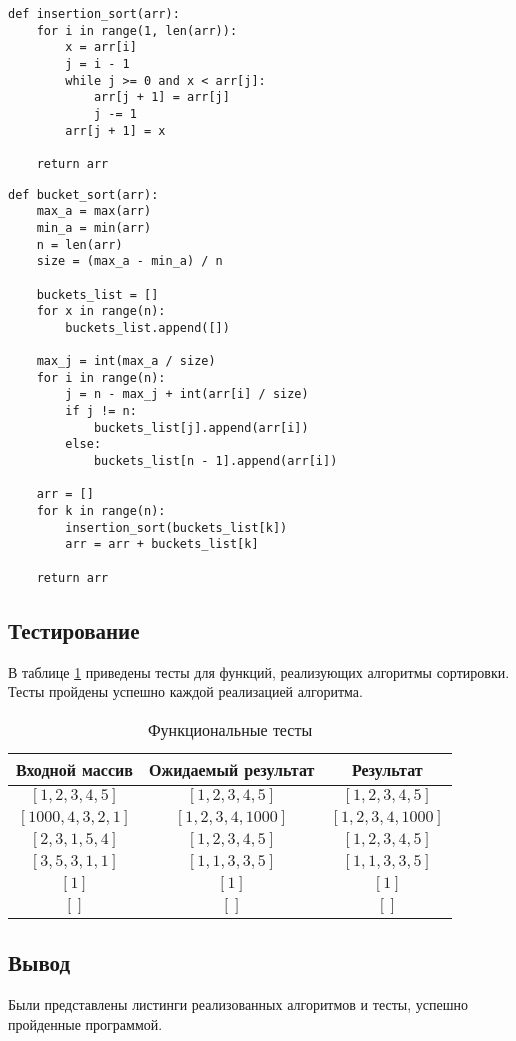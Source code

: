 \begin{lstlisting}[label=lst:insert_sort,caption= Алгоритм сортировки вставками]
def insertion_sort(arr):
    for i in range(1, len(arr)):
        x = arr[i]
        j = i - 1
        while j >= 0 and x < arr[j]:
            arr[j + 1] = arr[j]
            j -= 1
        arr[j + 1] = x

    return arr
\end{lstlisting}
\clearpage

\begin{lstlisting}[label=lst:bucket_sort,caption=Алгоритм блочной сортировки]
def bucket_sort(arr):
    max_a = max(arr)
    min_a = min(arr)
    n = len(arr)
    size = (max_a - min_a) / n

    buckets_list = []
    for x in range(n):
        buckets_list.append([])

    max_j = int(max_a / size)
    for i in range(n):
        j = n - max_j + int(arr[i] / size)
        if j != n:
            buckets_list[j].append(arr[i])
        else:
            buckets_list[n - 1].append(arr[i])

    arr = []
    for k in range(n):
        insertion_sort(buckets_list[k])
        arr = arr + buckets_list[k]

    return arr
\end{lstlisting}
\clearpage

\subsection{Тестирование}

В таблице \ref{tbl:functional_test} приведены тесты для функций, реализующих алгоритмы сортировки. 
Тесты пройдены успешно каждой реализацией алгоритма.


\begin{table}[h]
	\begin{center}
		\caption{\label{tbl:functional_test} Функциональные тесты}
		\begin{tabular}{|c|c|c|}
			\hline
			Входной массив & Ожидаемый результат & Результат \\ 
			\hline
			$[1,2,3,4,5]$ & $[1,2,3,4,5]$  & $[1,2,3,4,5]$\\
			$[1000,4,3,2,1]$  & $[1,2,3,4,1000]$ & $[1,2,3,4,1000]$\\
			$[2,3,1,5,4]$  & $[1,2,3,4,5]$  & $[1,2,3,4,5]$\\
			$[3,5,3,1,1]$  & $[1,1,3,3,5]$  & $[1,1,3,3,5]$\\
			$[1]$  & $[1]$  & $[1]$\\
			$[]$  & $[]$  & $[]$\\
			\hline
		\end{tabular}
	\end{center}
\end{table}


\subsection*{Вывод}

Были представлены листинги реализованных алгоритмов и тесты, успешно пройденные программой.